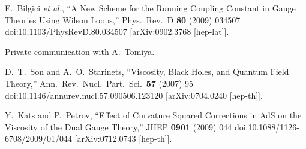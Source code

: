 \documentclass[a4paper,11pt]{article}
\begin{document}
\begin{thebibliography}{99}
  E.~Bilgici {\it et al.},
  ``A New Scheme for the Running Coupling Constant in Gauge Theories Using Wilson Loops,''
  Phys.\ Rev.\ D {\bf 80} (2009) 034507
  doi:10.1103/PhysRevD.80.034507
  [arXiv:0902.3768 [hep-lat]].



Private communication with A.~Tomiya.

 



  D.~T.~Son and A.~O.~Starinets,
  ``Viscosity, Black Holes, and Quantum Field Theory,''
  Ann.\ Rev.\ Nucl.\ Part.\ Sci.\  {\bf 57} (2007) 95
  doi:10.1146/annurev.nucl.57.090506.123120
  [arXiv:0704.0240 [hep-th]].


  Y.~Kats and P.~Petrov,
  ``Effect of Curvature Squared Corrections in AdS on the Viscosity of the Dual Gauge Theory,''
  JHEP {\bf 0901} (2009) 044
  doi:10.1088/1126-6708/2009/01/044
  [arXiv:0712.0743 [hep-th]].




       
  
\end{thebibliography}
\end{document}
